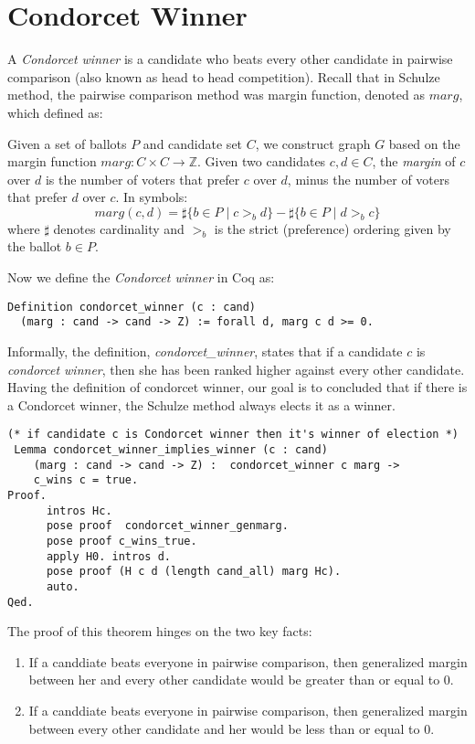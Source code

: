  \section{Condorcet Winner}
	A \textit{Condorcet winner} is a candidate who beats every other candidate in pairwise comparison (also known as head to head competition). 
	Recall that in Schulze method, the pairwise comparison method was margin function, denoted as $marg$, which defined as:
	\begin{displayquote}
	Given a set of ballots $P$ and candidate set $C$, we construct graph $G$ based on the margin function $marg: C \times C \to \mathbb{Z}$. Given two candidates $c, d \in C$,
the \emph{margin} of $c$ over $d$ is
the number of voters that prefer $c$ over $d$, minus the number of voters that prefer $d$ over $c$. 
In symbols:
\[
  marg(c, d) = \sharp \lbrace b \in P \mid c >_b d \rbrace -
            \sharp \lbrace b \in P \mid d >_b c \rbrace
\] where $\sharp$ denotes cardinality and $>_b$ is the strict
(preference) ordering given by the ballot $b \in P$.
 
 \end{displayquote}
  
	 
  Now we define the \textit{Condorcet winner} in Coq as:
 \begin{verbatim}
Definition condorcet_winner (c : cand) 
  (marg : cand -> cand -> Z) := forall d, marg c d >= 0.
\end{verbatim}

  Informally, the definition, \textit{condorcet\_winner}, states that 
  if a candidate $c$  is \textit{condorcet winner}, then she has been ranked higher against
  every other candidate.  Having the definition of  condorcet winner, our goal is to concluded that if there is 
 	a Condorcet winner, the Schulze method always elects it as a winner.  
 	
\begin{verbatim}
(* if candidate c is Condorcet winner then it's winner of election *)
 Lemma condorcet_winner_implies_winner (c : cand) 
    (marg : cand -> cand -> Z) :  condorcet_winner c marg ->
    c_wins c = true. 
Proof.
      intros Hc. 
      pose proof  condorcet_winner_genmarg.
      pose proof c_wins_true.
      apply H0. intros d.
      pose proof (H c d (length cand_all) marg Hc).
      auto.
Qed.
\end{verbatim}
 		
 The proof of this theorem hinges on the two key facts:
 \begin{enumerate}
  \item If a canddiate beats everyone in pairwise comparison, then generalized margin between her and every other candidate would 
      be  greater than or equal to 0.
  \item If a canddiate beats everyone in pairwise comparison, then generalized margin between every other candidate and her would 
      be  less than or equal to 0.
 \end{enumerate}
 
